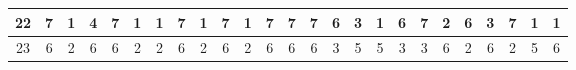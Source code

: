 \begin{sidewaystable}[]
\begin{tabular}{|c|c|c|c|c|c|c|c|c|c|c|c|c|c|c|c|c|c|c|c|c|c|c|c|c|}
    22      & 7                                               & 1                                               & 4                                               & 7                                               & 1                                               & 1                                               & 7                                               & 1                                               & 7                                               & 1                                                & 7                                                & 7                                                & 7                                               & 6                                               & 3                                               & 1                                               & 6                                               & 7                                               & 2                                               & 6                                               & 3                                               & 7                                                & 1                                                & 1                                                \\ \hline
    23      & 6                                               & 2                                               & 6                                               & 6                                               & 2                                               & 2                                               & 6                                               & 2                                               & 6                                               & 2                                                & 6                                                & 6                                                & 6                                               & 3                                               & 5                                               & 5                                               & 3                                               & 3                                               & 6                                               & 2                                               & 6                                               & 2                                                & 5                                                & 6                                                \\ \hline

\end{tabular}
\end{sidewaystable}
